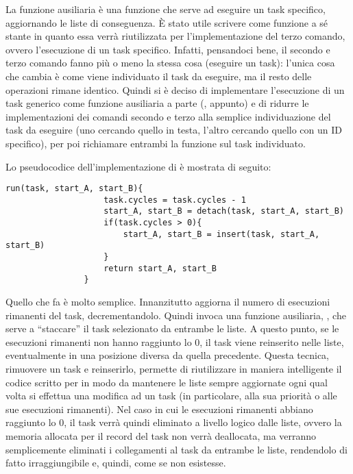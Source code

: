         La funzione ausiliaria  è una funzione che serve ad eseguire un task specifico, aggiornando le liste di conseguenza. È stato utile scrivere  come funzione a sé stante in quanto essa verrà riutilizzata per l'implementazione del terzo comando, ovvero l'esecuzione di un task specifico. Infatti, pensandoci bene, il secondo e terzo comando fanno più o meno la stessa cosa (eseguire un task): l'unica cosa che cambia è come viene individuato il task da eseguire, ma il resto delle operazioni rimane identico. Quindi si è deciso di implementare l'esecuzione di un task generico come funzione ausiliaria a parte (, appunto) e di ridurre le implementazioni dei comandi secondo e terzo alla semplice individuazione del task da eseguire (uno cercando quello in testa, l'altro cercando quello con un ID specifico), per poi richiamare entrambi la funzione  sul task individuato.
        
        Lo pseudocodice dell'implementazione di   è mostrata di seguito:
        
        \begin{center}
            \begin{lstlisting}[language=pseudo, gobble=14]
                run(task, start_A, start_B){
                    task.cycles = task.cycles - 1
                    start_A, start_B = detach(task, start_A, start_B)
                    if(task.cycles > 0){
                        start_A, start_B = insert(task, start_A, start_B)
                    }
                    return start_A, start_B
                }\end{lstlisting}
        \end{center}
        
        Quello che fa  è molto semplice. Innanzitutto aggiorna il numero di esecuzioni rimanenti del task, decrementandolo. Quindi invoca una funzione ausiliaria, , che serve a ``staccare'' il task selezionato da entrambe le liste. A questo punto, se le esecuzioni rimanenti non hanno raggiunto lo $0$, il task viene reinserito nelle liste, eventualmente in una posizione diversa da quella precedente. Questa tecnica, rimuovere un task e reinserirlo, permette di riutilizzare in maniera intelligente il codice scritto per  in modo da mantenere le liste sempre aggiornate ogni qual volta si effettua una modifica ad un task (in particolare, alla sua priorità o alle sue esecuzioni rimanenti). Nel caso in cui le esecuzioni rimanenti abbiano raggiunto lo $0$, il task verrà quindi eliminato a livello logico dalle liste, ovvero la memoria allocata per il record del task non verrà deallocata, ma verranno semplicemente eliminati i collegamenti al task da entrambe le liste, rendendolo di fatto irraggiungibile e, quindi, come se non esistesse.
        
